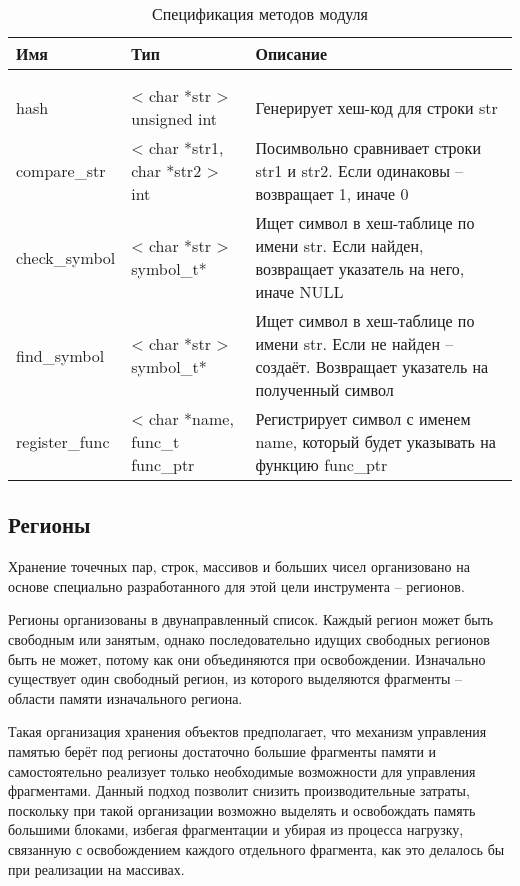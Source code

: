 \begin{xltabular}{\textwidth}{|l|p{4cm}|X|}
	\caption{Спецификация методов модуля \label{module_str_sym_funcs:table}}\\ \hline
	\centrow Имя & \centrow Тип & \centrow Описание \\ \hline
	 &  &  \\ \hline
	\endfirsthead
	 &  &  \\ \hline
	\finishhead
	hash & < char *str \linebreak > unsigned int & Генерирует хеш-код для строки str \\ \hline
	compare\_str & < char *str1, char *str2 \linebreak > int & Посимвольно сравнивает строки str1 и str2. Если одинаковы -- возвращает 1, иначе 0 \\ \hline
	check\_symbol & < char *str \linebreak > symbol\_t* & Ищет символ в хеш-таблице по имени str. Если найден, возвращает указатель на него, иначе NULL \\ \hline
	find\_symbol & < char *str \linebreak > symbol\_t* & Ищет символ в хеш-таблице по имени str. Если не найден -- создаёт. Возвращает указатель на полученный символ \\ \hline
	register\_func & < char *name, func\_t func\_ptr & Регистрирует символ с именем name, который будет указывать на функцию func\_ptr
\end{xltabular}

\subsection{Регионы}

Хранение точечных пар, строк, массивов и больших чисел организовано на основе специально разработанного для этой цели инструмента -- регионов.

Регионы организованы в двунаправленный список. Каждый регион может быть свободным или занятым, однако последовательно идущих свободных регионов быть не может, потому как они объединяются при освобождении. Изначально существует один свободный регион, из которого выделяются фрагменты -- области памяти изначального региона.

Такая организация хранения объектов предполагает, что механизм управления памятью берёт под регионы достаточно большие фрагменты памяти и самостоятельно реализует только необходимые возможности для управления фрагментами. Данный подход позволит снизить производительные затраты, поскольку при такой организации возможно выделять и освобождать память большими блоками, избегая фрагментации и убирая из процесса нагрузку, связанную с освобождением каждого отдельного фрагмента, как это делалось бы при реализации на массивах.


